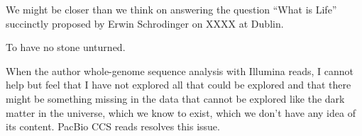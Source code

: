 We might be closer than we think on answering the question “What is Life” succinctly proposed by Erwin Schrodinger on XXXX at Dublin. 


To have no stone unturned.

When the author whole-genome sequence analysis with Illumina reads, I cannot help but feel that I have not explored all that could be explored and that there might be something missing in the data that cannot be explored like the dark matter in the universe, which we know to exist, which we don’t have any idea of its content. PacBio CCS reads resolves this issue.







